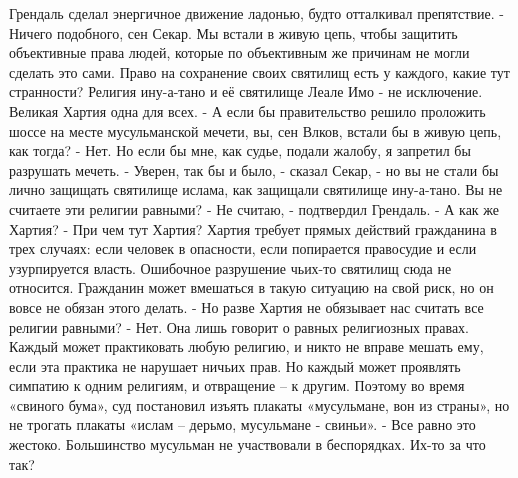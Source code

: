 \documentclass[10pt,final]{book}
\begin{document}
Грендаль сделал энергичное движение ладонью, будто отталкивал препятствие.
- Ничего подобного, сен Секар. Мы встали в живую цепь, чтобы защитить объективные права людей, которые по объективным же причинам не могли сделать это сами. Право на сохранение своих святилищ есть у каждого, какие тут странности? Религия ину-а-тано и её святилище Леале Имо - не исключение. Великая Хартия одна для всех.
- А если бы правительство решило проложить шоссе на месте мусульманской мечети, вы, сен Влков, встали бы в живую цепь, как тогда?
- Нет. Но если бы мне, как судье, подали жалобу, я запретил бы разрушать мечеть.
- Уверен, так бы и было, - сказал Секар, - но вы не стали бы лично защищать святилище ислама, как защищали святилище ину-а-тано. Вы не считаете эти религии равными?
- Не считаю, - подтвердил Грендаль.
- А как же Хартия?
- При чем тут Хартия? Хартия требует прямых действий гражданина в трех случаях: если человек в опасности, если попирается правосудие и если узурпируется власть. Ошибочное разрушение чьих-то святилищ сюда не относится. Гражданин может вмешаться в такую ситуацию на свой риск, но он вовсе не обязан этого делать.
- Но разве Хартия не обязывает нас считать все религии равными?
- Нет. Она лишь говорит о равных религиозных правах. Каждый может практиковать любую религию, и никто не вправе мешать ему, если эта практика не нарушает ничьих прав. Но каждый может проявлять симпатию к одним религиям, и отвращение -- к другим. Поэтому во время «свиного бума», суд постановил изъять плакаты «мусульмане, вон из страны», но не трогать плакаты «ислам -- дерьмо, мусульмане - свиньи».
- Все равно это жестоко. Большинство мусульман не участвовали в беспорядках. Их-то за что так?
\end{document}
